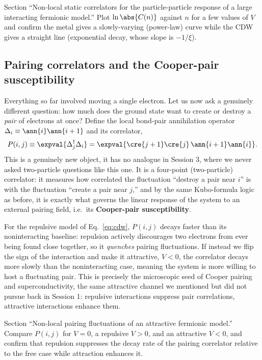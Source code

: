 \documentclass[all_sessions.tex]{subfiles}
\begin{document}
\begin{notebook}
Section ``Non-local static correlators for the particle-particle response of a large interacting
fermionic model.'' Plot $\ln\abs{C(n)}$ against $n$ for a few values of $V$ and confirm the metal
gives a slowly-varying (power-law) curve while the CDW gives a straight line (exponential decay,
whose slope is $-1/\xi$).
\end{notebook}

\subsection{Pairing correlators and the Cooper-pair susceptibility}
Everything so far involved moving a single electron. Let us now ask a genuinely different question:
how much does the ground state want to create or destroy a \emph{pair} of electrons at once? Define
the local bond-pair annihilation operator $\Delta_i \equiv \ann{i}\ann{i+1}$ and its correlator,
\begin{equation}
  P(i,j) \equiv \expval{\Delta_j^{\dagger}\Delta_i}
    = \expval{\cre{j+1}\cre{j}\,\ann{i+1}\ann{i}}.
\end{equation}
This is a genuinely new object, it has no analogue in Session 3, where we never asked two-particle
questions like this one. It is a four-point (two-particle) correlator: it measures how correlated
the fluctuation ``destroy a pair near $i$'' is with the fluctuation ``create a pair near $j$,'' and
by the same Kubo-formula logic as before, it is exactly what governs the linear response of the
system to an external pairing field, i.e.\ its \textbf{Cooper-pair susceptibility}.

For the repulsive model of Eq.~\eqref{eq:cdw}, $P(i,j)$ decays faster than its noninteracting
baseline: repulsion actively discourages two electrons from ever being found close together, so it
\emph{quenches} pairing fluctuations. If instead we flip the sign of the interaction and make it
attractive, $V<0$, the correlator decays more slowly than the noninteracting case, meaning the
system is more willing to host a fluctuating pair. This is precisely the microscopic seed of Cooper
pairing and superconductivity, the same attractive channel we mentioned but did not pursue back in
Session 1: repulsive interactions suppress pair correlations, attractive interactions enhance them.

\begin{notebook}
Section ``Non-local pairing fluctuations of an attractive fermionic model.'' Compare $P(i,j)$ for
$V=0$, a repulsive $V>0$, and an attractive $V<0$, and confirm that repulsion suppresses the decay
rate of the pairing correlator relative to the free case while attraction enhances it.
\end{notebook}
\end{document}

